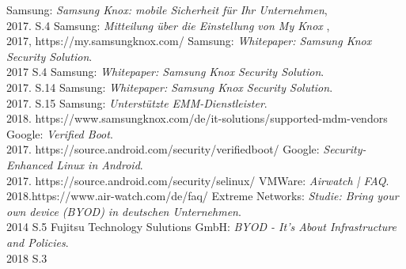 \documentclass[11pt,a4paper,oneside, 
liststotoc, 					%
bibtotoc,						%
titlepage, 						%
headsepline, 					%
BCOR6mm,						%
]{scrreprt}
\begin{document}
\begin{thebibliography}{999999}

Samsung: \emph{Samsung Knox: mobile Sicherheit für Ihr Unternehmen},\\2017. S.4
Samsung: \emph{Mitteilung über die Einstellung von My Knox },\\2017, https://my.samsungknox.com/
Samsung: \emph{Whitepaper: Samsung Knox Security Solution}.\\2017 S.4
Samsung: \emph{Whitepaper: Samsung Knox Security Solution}.\\2017. S.14
Samsung: \emph{Whitepaper: Samsung Knox Security Solution}.\\2017. S.15
Samsung: \emph{Unterstützte EMM-Dienstleister}.\\2018. https://www.samsungknox.com/de/it-solutions/supported-mdm-vendors
Google: \emph{Verified Boot}.\\2017. https://source.android.com/security/verifiedboot/
Google: \emph{Security-Enhanced Linux in Android}.\\2017. https://source.android.com/security/selinux/
VMWare: \emph {Airwatch | FAQ}.\\2018.https://www.air-watch.com/de/faq/
Extreme Networks: \emph{Studie: Bring your own device (BYOD) in deutschen Unternehmen}. \\2014 S.5
Fujitsu Technology Sulutions GmbH: \emph{BYOD - It's About Infrastructure and Policies}. \\2018 S.3


\end{thebibliography}


\begin{appendix}
\clearpage
{}						%
\end{appendix}
\end{document}
